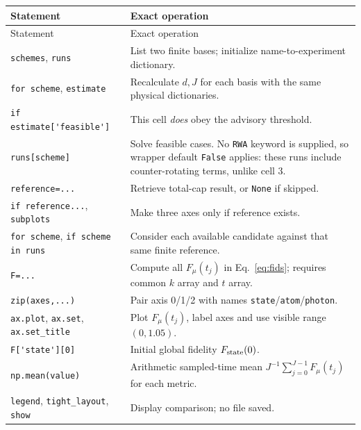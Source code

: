 \documentclass[11pt,a4paper]{article}
\newcommand{\code}[1]{\nolinkurl{#1}}
\begin{document}
\begin{longtable}{p{}p{}}
\toprule Statement & Exact operation\\\midrule\endfirsthead
\toprule Statement & Exact operation\\\midrule\endhead
\code{schemes}, \code{runs} & List two finite bases; initialize name-to-experiment dictionary.\\
\code{for scheme}, \code{estimate} & Recalculate $d,J$ for each basis with the same physical dictionaries.\\
\code{if estimate['feasible']} & This cell \emph{does} obey the advisory threshold.\\
\code{runs[scheme]} & Solve feasible cases. No \code{RWA} keyword is supplied, so wrapper default \code{False} applies: these runs include counter-rotating terms, unlike cell 3.\\
\code{reference=...} & Retrieve total-cap result, or \code{None} if skipped.\\
\code{if reference...}, \code{subplots} & Make three axes only if reference exists.\\
\code{for scheme}, \code{if scheme in runs} & Consider each available candidate against that same finite reference.\\
\code{F=...} & Compute all $F_\mu(t_j)$ in Eq.~\eqref{eq:fids}; requires common $k$ array and $t$ array.\\
\code{zip(axes,...)} & Pair axis 0/1/2 with names \code{state}/\code{atom}/\code{photon}.\\
\code{ax.plot}, \code{ax.set}, \code{ax.set_title} & Plot $F_\mu(t_j)$, label axes and use visible range $(0,1.05)$.\\
\code{F['state'][0]} & Initial global fidelity $F_{\rm state}(0)$.\\
\code{np.mean(value)} & Arithmetic sampled-time mean $J^{-1}\sum_{j=0}^{J-1}F_\mu(t_j)$ for each metric.\\
\code{legend}, \code{tight_layout}, \code{show} & Display comparison; no file saved.\\
\bottomrule
\end{longtable}
\end{document}
